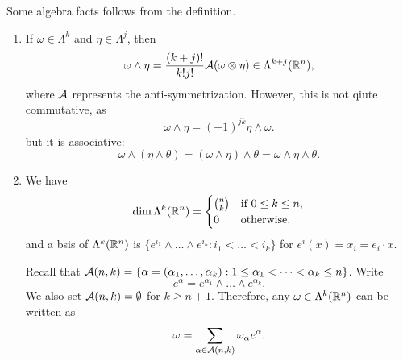 \documentclass[a4paper]{article}
\begin{document}
Some algebra facts follows from the definition. 
\begin{enumerate}
\item If $\omega \in \Lambda^k$ and $\eta \in \Lambda^j$, 
then 
\[
\omega \wedge \eta = \frac{(k+j)!}{k! j!} \mathcal{A} (\omega
\otimes \eta) \in \Lambda^{k+j}(\mathbb{R}^n),
\]
where $\mathcal{A}$ represents the anti-symmetrization. 
However, this is not qiute commutative, as 
\[
\omega \wedge \eta = (-1)^{jk} \eta \wedge \omega.
\]
but it is associative:
\[
\omega \wedge (\eta \wedge \theta) 
= (\omega \wedge \eta) \wedge \theta 
= \omega \wedge \eta \wedge \theta.
\]

\item We have 
\[
\dim \Lambda^k(\mathbb{R}^n) = \begin{cases}
  \binom{n}{k} & \text{if $0 \leq k \leq n$},\\
  0 & \text{otherwise}.
\end{cases}
\]
and a bsis of $\Lambda^k (\mathbb{R}^n)$ is 
$\{e^{i_1} \wedge \dots \wedge e^{i_k} : i_1 < \dots < i_k\}$
for $e^i (x) = x_i = e_i \cdot x$.

Recall that $\mathcal{A}(n, k) = \{\alpha = (\alpha_1, \dots, 
\alpha_k) : 1 \leq \alpha_1 < \dots < \alpha_k \leq n\}$.
Write 
\[
e^{\alpha} = e^{\alpha_1} \wedge \dots \wedge 
e^{\alpha_k}.
\]
We also set $\mathcal{A}(n, k) = \emptyset$ 
for $k \geq n + 1$. 
Therefore, any $\omega \in \Lambda^k(\mathbb{R}^n)$
can be written as 
\[
\omega = \sum_{\alpha \in \mathcal{A}(n, k)}
\omega_\alpha e^{\alpha}.
\]
\end{enumerate}
\end{document}

